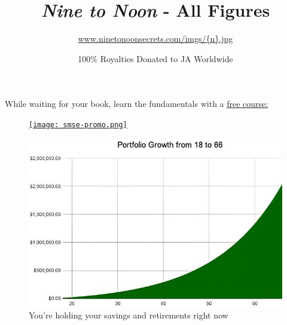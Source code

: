 \documentclass{article}
\title{\vspace{-.5cm}\textit{Nine to Noon} - All Figures}
\author{\href{https://www.ninetonoonsecrets.com/imgs/11.5.jpg}{www.ninetonoonsecrets.com/imgs/\{n\}.jpg}}
\date{100\% Royalties Donated to JA Worldwide}
\begin{document}
\maketitle
\thispagestyle{empty}


\begin{figure}[!htb]
    \centering
\end{figure}

\pagebreak
\thispagestyle{empty}
\begin{center}
\Large{While waiting for your book, learn the fundamentals with a \href{https://www.stockmarketsecrets.exposed}{free course:}}
\end{center}
\begin{figure}[!htb]
    \centering
    \href{https://www.stockmarketsecrets.exposed}{{\texttt{[image: smse-promo.png]}}}
\end{figure}
\pagebreak

\setcounter{page}{1}

\begin{figure}[!htb]
    \centering
    \includegraphics[width=\textwidth]{imgs/1.png}
    \caption{You're holding your savings and retirements right now}
\end{figure}





\vspace{10pt}
\end{document}
